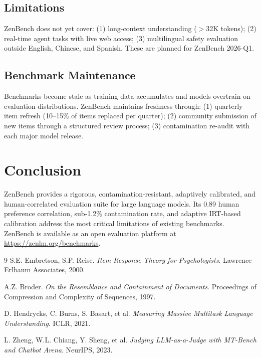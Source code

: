 \documentclass[11pt,a4paper]{article}
\begin{document}
\subsection{Limitations}

ZenBench does not yet cover: (1) long-context understanding ($>$32K tokens); (2)
real-time agent tasks with live web access; (3) multilingual safety evaluation outside
English, Chinese, and Spanish. These are planned for ZenBench 2026-Q1.

\subsection{Benchmark Maintenance}

Benchmarks become stale as training data accumulates and models overtrain on evaluation
distributions. ZenBench maintains freshness through: (1) quarterly item refresh
(10--15\% of items replaced per quarter); (2) community submission of new items through
a structured review process; (3) contamination re-audit with each major model release.

\section{Conclusion}
\label{sec:conclusion}

ZenBench provides a rigorous, contamination-resistant, adaptively calibrated, and
human-correlated evaluation suite for large language models. Its 0.89 human preference
correlation, sub-1.2\% contamination rate, and adaptive IRT-based calibration address
the most critical limitations of existing benchmarks. ZenBench is available as an
open evaluation platform at \url{https://zenlm.org/benchmarks}.

\begin{thebibliography}{9}
S.E. Embretson, S.P. Reise.
\textit{Item Response Theory for Psychologists}.
Lawrence Erlbaum Associates, 2000.

A.Z. Broder.
\textit{On the Resemblance and Containment of Documents}.
Proceedings of Compression and Complexity of Sequences, 1997.

D. Hendrycks, C. Burns, S. Basart, et al.
\textit{Measuring Massive Multitask Language Understanding}.
ICLR, 2021.

L. Zheng, W.L. Chiang, Y. Sheng, et al.
\textit{Judging LLM-as-a-Judge with MT-Bench and Chatbot Arena}.
NeurIPS, 2023.
\end{thebibliography}
\end{document}
